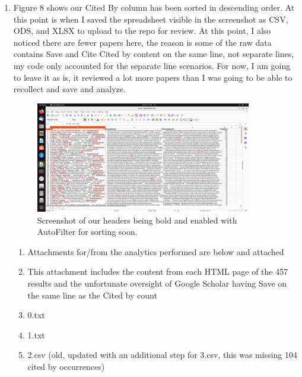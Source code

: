 \documentclass{article}
\begin{document}
\begin{enumerate}
\begin{figure}[ht!]
                \end{figure}
            \clearpage
            \item Figure 8 shows our Cited By column has been sorted in descending order. At this point is when I saved the spreadsheet visible in the screenshot as CSV, ODS, and XLSX to upload to the repo for review. At this point, I also noticed there are fewer papers here, the reason is some of the raw data contains Save and Cite Cited by content on the same line, not separate lines, my code only accounted for the separate line scenarios. For now, I am going to leave it as is, it reviewed a lot more papers than I was going to be able to recollect and save and analyze.
                \begin{figure}[ht!] %
                \centering
                \caption{\label{fig:TableOfContentsSnippet.png}Screenshot of our headers being bold and enabled with AutoFilter for sorting soon.}
                \includegraphics[width=0.89\textwidth, height=0.5\textwidth]{2023-09-10 17 48 14.png}
                \end{figure}
                \begin{enumerate}
                    \item[] Attachments for/from the analytics performed are below and attached
                    \item[] This attachment includes the content from each HTML page of the 457 results and the unfortunate oversight of Google Scholar having Save on the same line as the Cited by count
                    \item 0.txt
                    \item 1.txt
                    \item 2.csv (old, updated with an additional step for 3.csv, this was missing 104 cited by occurrences)

\end{enumerate}
\end{enumerate}
\end{document}
